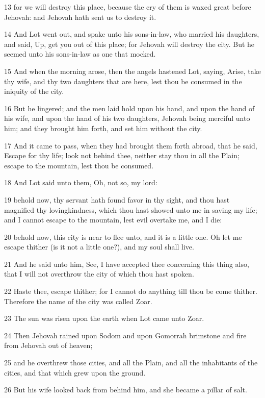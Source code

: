 \par 13 for we will destroy this place, because the cry of them is waxed great before Jehovah: and Jehovah hath sent us to destroy it.
\par 14 And Lot went out, and spake unto his sons-in-law, who married his daughters, and said, Up, get you out of this place; for Jehovah will destroy the city. But he seemed unto his sons-in-law as one that mocked.
\par 15 And when the morning arose, then the angels hastened Lot, saying, Arise, take thy wife, and thy two daughters that are here, lest thou be consumed in the iniquity of the city.
\par 16 But he lingered; and the men laid hold upon his hand, and upon the hand of his wife, and upon the hand of his two daughters, Jehovah being merciful unto him; and they brought him forth, and set him without the city.
\par 17 And it came to pass, when they had brought them forth abroad, that he said, Escape for thy life; look not behind thee, neither stay thou in all the Plain; escape to the mountain, lest thou be consumed.
\par 18 And Lot said unto them, Oh, not so, my lord:
\par 19 behold now, thy servant hath found favor in thy sight, and thou hast magnified thy lovingkindness, which thou hast showed unto me in saving my life; and I cannot escape to the mountain, lest evil overtake me, and I die:
\par 20 behold now, this city is near to flee unto, and it is a little one. Oh let me escape thither (is it not a little one?), and my soul shall live.
\par 21 And he said unto him, See, I have accepted thee concerning this thing also, that I will not overthrow the city of which thou hast spoken.
\par 22 Haste thee, escape thither; for I cannot do anything till thou be come thither. Therefore the name of the city was called Zoar.
\par 23 The sun was risen upon the earth when Lot came unto Zoar.
\par 24 Then Jehovah rained upon Sodom and upon Gomorrah brimstone and fire from Jehovah out of heaven;
\par 25 and he overthrew those cities, and all the Plain, and all the inhabitants of the cities, and that which grew upon the ground.
\par 26 But his wife looked back from behind him, and she became a pillar of salt.
